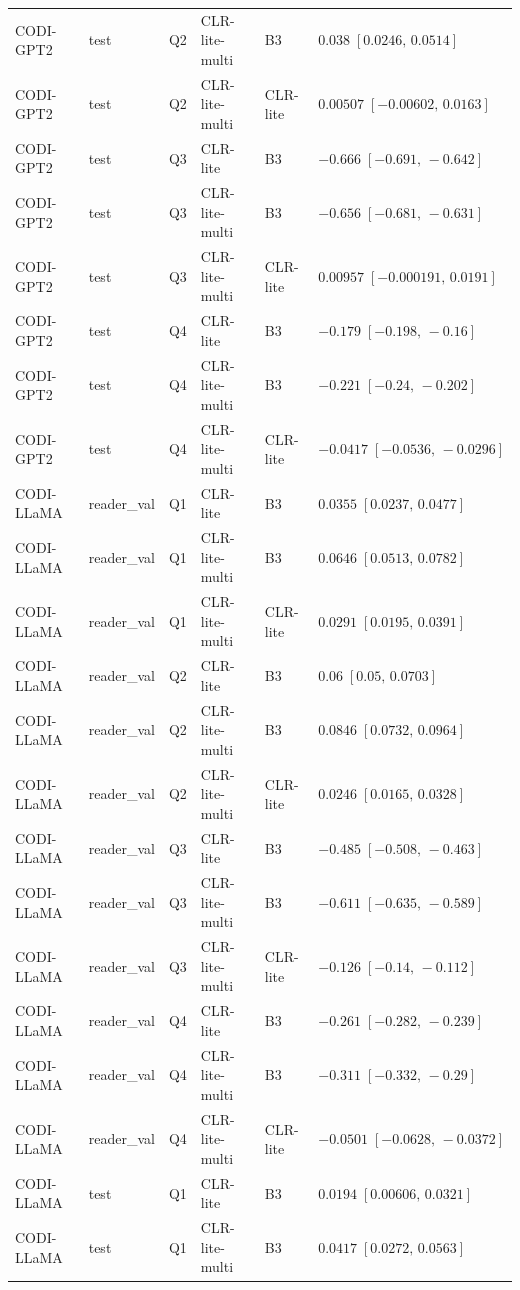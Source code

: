 \begin{longtable}{@{}p{}p{}p{}p{}p{}p{}@{}}
CODI-GPT2 & test & Q2 & CLR-lite-multi & B3 & $0.038\;[0.0246,\,0.0514]$ \\
CODI-GPT2 & test & Q2 & CLR-lite-multi & CLR-lite & $0.00507\;[-0.00602,\,0.0163]$ \\
CODI-GPT2 & test & Q3 & CLR-lite & B3 & $-0.666\;[-0.691,\,-0.642]$ \\
CODI-GPT2 & test & Q3 & CLR-lite-multi & B3 & $-0.656\;[-0.681,\,-0.631]$ \\
CODI-GPT2 & test & Q3 & CLR-lite-multi & CLR-lite & $0.00957\;[-0.000191,\,0.0191]$ \\
CODI-GPT2 & test & Q4 & CLR-lite & B3 & $-0.179\;[-0.198,\,-0.16]$ \\
CODI-GPT2 & test & Q4 & CLR-lite-multi & B3 & $-0.221\;[-0.24,\,-0.202]$ \\
CODI-GPT2 & test & Q4 & CLR-lite-multi & CLR-lite & $-0.0417\;[-0.0536,\,-0.0296]$ \\
CODI-LLaMA & reader\_val & Q1 & CLR-lite & B3 & $0.0355\;[0.0237,\,0.0477]$ \\
CODI-LLaMA & reader\_val & Q1 & CLR-lite-multi & B3 & $0.0646\;[0.0513,\,0.0782]$ \\
CODI-LLaMA & reader\_val & Q1 & CLR-lite-multi & CLR-lite & $0.0291\;[0.0195,\,0.0391]$ \\
CODI-LLaMA & reader\_val & Q2 & CLR-lite & B3 & $0.06\;[0.05,\,0.0703]$ \\
CODI-LLaMA & reader\_val & Q2 & CLR-lite-multi & B3 & $0.0846\;[0.0732,\,0.0964]$ \\
CODI-LLaMA & reader\_val & Q2 & CLR-lite-multi & CLR-lite & $0.0246\;[0.0165,\,0.0328]$ \\
CODI-LLaMA & reader\_val & Q3 & CLR-lite & B3 & $-0.485\;[-0.508,\,-0.463]$ \\
CODI-LLaMA & reader\_val & Q3 & CLR-lite-multi & B3 & $-0.611\;[-0.635,\,-0.589]$ \\
CODI-LLaMA & reader\_val & Q3 & CLR-lite-multi & CLR-lite & $-0.126\;[-0.14,\,-0.112]$ \\
CODI-LLaMA & reader\_val & Q4 & CLR-lite & B3 & $-0.261\;[-0.282,\,-0.239]$ \\
CODI-LLaMA & reader\_val & Q4 & CLR-lite-multi & B3 & $-0.311\;[-0.332,\,-0.29]$ \\
CODI-LLaMA & reader\_val & Q4 & CLR-lite-multi & CLR-lite & $-0.0501\;[-0.0628,\,-0.0372]$ \\
CODI-LLaMA & test & Q1 & CLR-lite & B3 & $0.0194\;[0.00606,\,0.0321]$ \\
CODI-LLaMA & test & Q1 & CLR-lite-multi & B3 & $0.0417\;[0.0272,\,0.0563]$ \\

\end{longtable}
